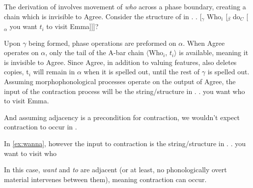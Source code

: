 \documentclass[MilwayThesis]{subfiles}
\begin{document}
The derivation of \Last[b] involves movement of \textit{who} across a phase boundary, creating a chain which is invisible to Agree.
Consider the structure of \Last[b] in \Next.
\ex. \label{fig:star-wanna-tree}
[$_\gamma$ Who$_i$ [$_\beta$ do$_C$ [$_\alpha$ you want $t_i$ to visit Emma]]]?

Upon $\gamma$ being formed, phase operations are preformed on $\alpha$.
When Agree operates on $\alpha$, only the tail of the A-bar chain $\langle$Who$_i$, $t_i\rangle$ is available, meaning it is invisible to Agree.
Since Agree, in addition to valuing features, also deletes copies, t$_i$ will remain in $\alpha$ when it is spelled out, until the rest of $\gamma$ is spelled out.
Assuming morphophonological processes operate on the output of Agree, the input of the contraction process will be the string/structure in \Next.
\ex. you want who to visit Emma.

And assuming adjacency is a precondition for contraction, we wouldn't expect contraction to occur in \Last.

In \ref{ex:wanna}, however the input to contraction is the string/structure in \Next.
\ex. you want to visit who

In this case, \textit{want} and \textit{to} are adjacent (or at least, no phonologically overt material intervenes between them), meaning contraction can occur.
\end{document}
